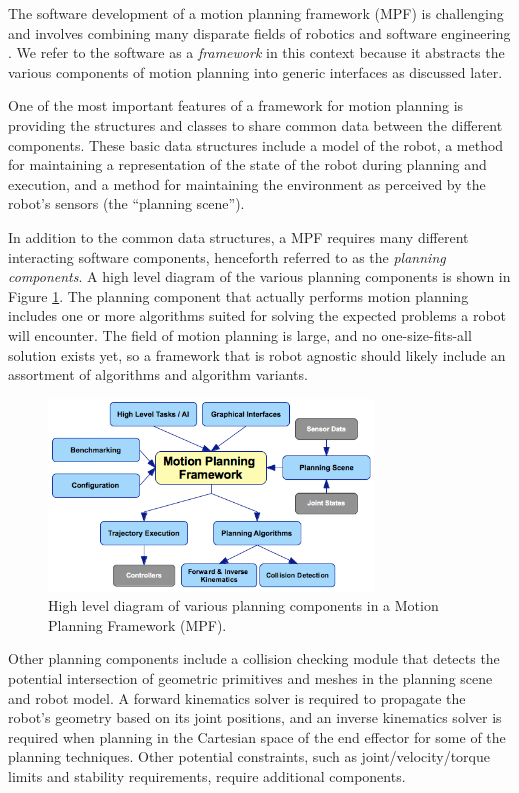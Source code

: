 \documentclass[10pt,journal,compsoc]{joser1}
\begin{document}
{The software development of a motion planning framework (MPF) is challenging and involves combining many disparate fields of robotics and software engineering \cite{perez2010roadmap}. We refer to the software as a \textit{framework} in this context because it abstracts the various components of motion planning into generic interfaces as discussed later.

One of the most important features of a framework for motion planning is providing the structures and classes to share common data between the different components. These basic data structures include a model of the robot, a method for maintaining a representation of the state of the robot during planning and execution, and a method for maintaining the environment as perceived by the robot's sensors (the ``planning scene'').

In addition to the common data structures, a MPF requires many different interacting software components, henceforth referred to as the \textit{planning components}. A high level diagram of the various planning components is shown in Figure \ref{fig:motionplanning_highlevel}. The planning component that actually performs motion planning includes one or more algorithms suited for solving the expected problems a robot will encounter. The field of motion planning is large, and no one-size-fits-all solution exists yet, so a framework that is robot agnostic should likely include an assortment of algorithms and algorithm variants.

\begin{figure}[!t]
\centering
\includegraphics[width=3.4in]{images/motionplanning_highlevel}
\caption{High level diagram of various planning components in a Motion Planning Framework (MPF).}
\label{fig:motionplanning_highlevel}
\end{figure} 

Other planning components include a collision checking module that detects the potential intersection of geometric primitives and meshes in the planning scene and robot model. A forward kinematics solver is required to propagate the robot's geometry based on its joint positions, and an inverse kinematics solver is required when planning in the Cartesian space of the end effector for some of the planning techniques. Other potential constraints, such as joint/velocity/torque limits and stability requirements, require additional components.

}
\end{document}
